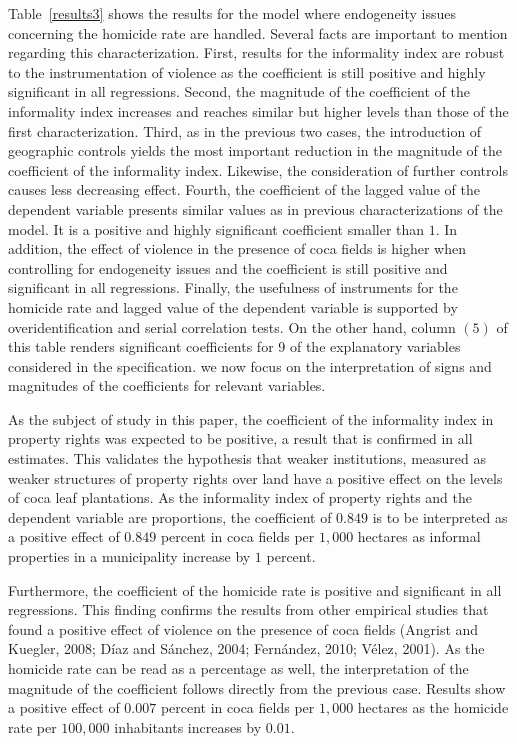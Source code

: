 Table~\ref{results3} shows the results for the model where endogeneity issues concerning the homicide rate are handled. Several facts are important to mention regarding this characterization. First, results for the informality index are robust to the instrumentation of violence as the coefficient is still positive and highly significant in all regressions. Second, the magnitude of the coefficient of the informality index increases and reaches similar but higher levels than those of the first characterization. Third, as in the previous two cases, the introduction of geographic controls yields the most important reduction in the magnitude of the coefficient of the informality index. Likewise, the consideration of further controls causes less decreasing effect. Fourth, the coefficient of the lagged value of the dependent variable presents similar values as in previous characterizations of the model. It is a positive and highly significant coefficient smaller than $1$. In addition, the effect of violence in the presence of coca fields is higher when controlling for endogeneity issues and the coefficient is still positive and significant in all regressions. Finally, the usefulness of instruments for the homicide rate and lagged value of the dependent variable is supported by overidentification and serial correlation tests. On the other hand, column $(5)$ of this table renders significant coefficients for 9 of the explanatory variables considered in the specification. we now focus on the interpretation of signs and magnitudes of the coefficients for relevant variables.

As the subject of study in this paper, the coefficient of the informality index in property rights was expected to be positive, a result that is confirmed in all estimates. This validates the hypothesis that weaker institutions, measured as weaker structures of property rights over land have a positive effect on the levels of coca leaf plantations. As the informality index of property rights and the dependent variable are proportions, the coefficient of $0.849$ is to be interpreted as a positive effect of $0.849$ percent in coca fields per $1,000$ hectares as informal properties in a municipality increase by $1$ percent. 

Furthermore, the coefficient of the homicide rate is positive and significant in all regressions. This finding confirms the results from other empirical studies that found a positive effect of violence on the presence of coca fields (Angrist and Kuegler, 2008; D\'{i}az and S\'{a}nchez, 2004; Fern\'{a}ndez, 2010; V\'{e}lez, 2001). As the homicide rate can be read as a percentage as well, the interpretation of the magnitude of the coefficient follows directly from the previous case. Results show a positive effect of $0.007$ percent in coca fields per $1,000$ hectares as the homicide rate per $100,000$ inhabitants increases by $0.01$. 


